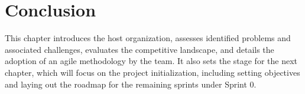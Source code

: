 \setcounter{secnumdepth}{0} %
\section{Conclusion}
This chapter introduces the host organization, assesses identified problems and associated challenges, evaluates the competitive landscape, and details the adoption of an agile methodology by the team. It also sets the stage for the next chapter, which will focus on the project initialization, including setting objectives and laying out the roadmap for the remaining sprints under Sprint 0.